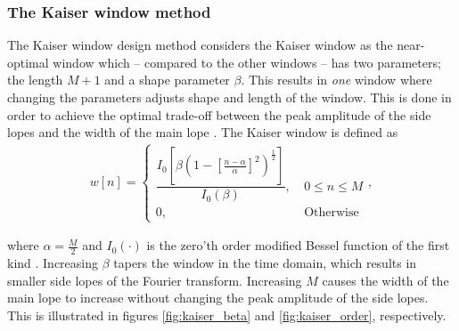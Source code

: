\subsubsection{The Kaiser window method}
The Kaiser window design method considers the Kaiser window as the near-optimal window which -- compared to the other windows -- has two parameters; the length $M+1$ and a shape parameter $\beta$. This results in \textit{one} window where changing the parameters adjusts shape and length of the window. This is done in order to achieve the optimal trade-off between the peak amplitude of the side lopes and the width of the main lope \cite{page 566, DTSP}. The Kaiser window is defined as
\begin{align*}
w[n] =
\begin{cases}
\dfrac{I_0[\beta (1-[\frac{n-\alpha}{\alpha}]^2)^{\frac{1}{2}}]}{I_0(\beta)} , &\ 0 \leq n \leq M  \\ 
0, &\ \text{Otherwise}
\end{cases},
\end{align*}

where $\alpha=\frac{M}{2}$ and $I_0(\cdot)$ is the zero'th order modified Bessel function of the first kind \cite{page 566, DTSP}. Increasing $\beta$ tapers the window in the time domain, which results in smaller side lopes of the Fourier transform. Increasing $M$ causes the width of the main lope to increase without changing the peak amplitude of the side lopes. This is illustrated in figures \ref{fig:kaiser_beta} and \ref{fig:kaiser_order}, respectively.

